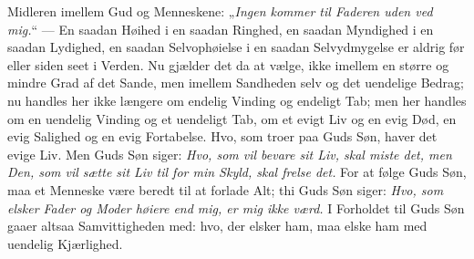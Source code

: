 \documentclass[12pt,a4paper]{book}
\begin{document}
Midleren imellem Gud og Menneskene: „\emph{Ingen kommer til Faderen uden ved mig.}“ ---
En saadan Høihed i en saadan Ringhed, en saadan Myndighed i en saadan Lydighed, en
saadan Selvophøielse i en saadan Selvydmygelse er aldrig før eller siden seet i Verden.
Nu gjælder det da at vælge, ikke imellem en større og mindre Grad af det Sande, men
imellem Sandheden selv og det uendelige Bedrag; nu handles her ikke længere om endelig
Vinding og endeligt Tab; men her handles om en uendelig Vinding og et uendeligt Tab, om
et evigt Liv og en evig Død, en evig Salighed og en evig Fortabelse. Hvo, som troer paa
Guds Søn, haver det evige Liv. Men Guds Søn siger: \emph{Hvo, som vil bevare sit Liv,
skal miste det, men Den, som vil sætte sit Liv til for min Skyld, skal frelse det.} For
at følge Guds Søn, maa et Menneske være beredt til at forlade Alt; thi Guds Søn siger:
\emph{Hvo, som elsker Fader og Moder høiere end mig, er mig ikke værd.} I Forholdet til
Guds Søn gaaer altsaa Samvittigheden med: hvo, der elsker ham, maa elske ham med
uendelig Kjærlighed.
\end{document}
